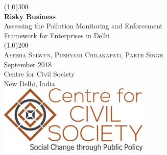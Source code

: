 \documentclass[a4paper, 12pt]{article}
\begin{document}
                    
                    \begin{titlepage}
                    	\begin{center}
                    	\line(1,0){300}\\
                    	[0.25in]
                    	\huge{\bfseries \textcolor{CCSbrown} {Risky Business}} \\
    	[0.5cm]
    	\large  {Assessing the Pollution Monitoring and Enforcement \\ Framework  for Enterprises in Delhi} \\
    	
                    	\line(1,0){200}\\
                    	[1in]
                    	\textsc{\huge Ayesha Selwyn, Pushyami Chilakapati,  Parth Singh} \\
                    	[1.5cm]
                    	{\Large September 2018} \\
                    	[2.0cm]
                    	{\LARGE Centre for Civil Society} \\
                    	[0.1mm]
                    	{\Large New Delhi, India} \\
    	[2.0cm]
    	\includegraphics[width = 75mm]{unnamed.png}
      
                    	\end{center}
                    \end{titlepage}
                    \tableofcontents
                    
                   \newpage
         
\end{document}
